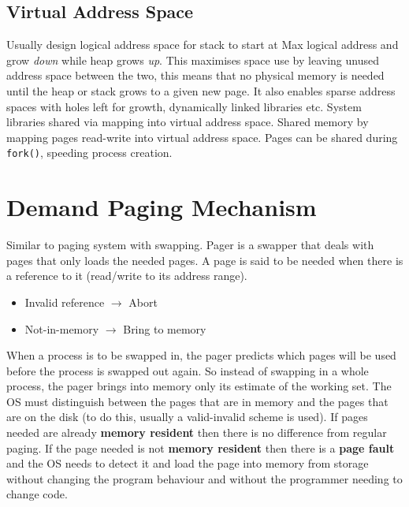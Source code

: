\documentclass[11pt]{article}
\begin{document}
\subsection{Virtual Address Space}
\label{sec:orgbc62ddf}
Usually design logical address space for stack to start at Max logical address and grow \emph{down} while heap grows \emph{up}.
This maximises space use by leaving unused address space between the two, this means that no physical memory is needed until the heap or stack grows to a given new page.
It also enables sparse address spaces with holes left for growth, dynamically linked libraries etc.
System libraries shared via mapping into virtual address space.
Shared memory by mapping pages read-write into virtual address space.
Pages can be shared during \texttt{fork()}, speeding process creation.
\section{Demand Paging Mechanism}
\label{sec:org9041607}
Similar to paging system with swapping.
Pager is a swapper that deals with pages that only loads the needed pages.
A page is said to be needed when there is a reference to it (read/write to its address range).
\begin{itemize}
\item Invalid reference \(\rightarrow\) Abort
\item Not-in-memory \(\rightarrow\) Bring to memory
\end{itemize}
When a process is to be swapped in, the pager predicts which pages will be used before the process is swapped out again.
So instead of swapping in a whole process, the pager brings into memory only its estimate of the working set.
The OS must distinguish between the pages that are in memory and the pages that are on the disk (to do this, usually a valid-invalid scheme is used).
If pages needed are already \textbf{memory resident} then there is no difference from regular paging.
If the page needed is not \textbf{memory resident} then there is a \textbf{page fault} and the OS needs to detect it and load the page into memory from storage without changing the program behaviour and without the programmer needing to change code.
\end{document}
